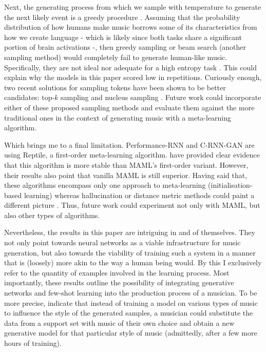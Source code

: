 \documentclass[a4paper]{book}
\begin{document}
Next, the generating process from which we sample with temperature to generate the next likely event is a greedy procedure \parencite{holtzman_curious_2019}. Assuming that the probability distribution of how humans make music borrows some of its characteristics from how we create language - which is likely since both tasks share a significant portion of brain activations \parencite{brown_music_2006} -, then greedy sampling or beam search (another sampling method) would completely fail to generate human-like music. Specifically, they are not ideal nor adequate for a high entropy task \parencite{holtzman_curious_2019}. This could explain why the models in this paper scored low in repetitions. Curiously enough, two recent solutions for sampling tokens have been shown to be better candidates: top-$k$ sampling \parencite{fan_hierarchical_2018} and nucleus sampling \parencite[also known as top-$p$ sampling;][]{holtzman_curious_2019}. Future work could incorporate either of these proposed sampling methods and evaluate them against the more traditional ones in the context of generating music with a meta-learning algorithm.

Which brings me to a final limitation. Performance-RNN and C-RNN-GAN are using Reptile, a first-order meta-learning algorithm. \textcite{nichol_first-order_2018} have provided clear evidence that this algorithm is more stable than MAML's first-order variant. However, their results also point that vanilla MAML is still superior. Having said that, these algorithms encompass only one approach to meta-learning (initialisation-based learning) whereas hallucination or distance metric methods could paint a different picture \parencite{chen_closer_2018}. Thus, future work could experiment not only with MAML, but also other types of algorithms.

Nevertheless, the results in this paper are intriguing in and of themselves. They not only point towards neural networks as a viable infrastructure for music generation, but also towards the viability of training such a system in a manner that is (loosely) more akin to the way a human being would. By this I exclusively refer to the quantity of examples involved in the learning process. Most importantly, these results outline the possibility of integrating generative networks and few-shot learning into the production process of a musician. To be more precise, \textcite{larochelle_few-shot_2017} indicate that instead of training a model on various types of music to influence the style of the generated samples, a musician could substitute the data from a support set with music of their own choice and obtain a new generative model for that particular style of music (admittedly, after a few more hours of training).
\end{document}
